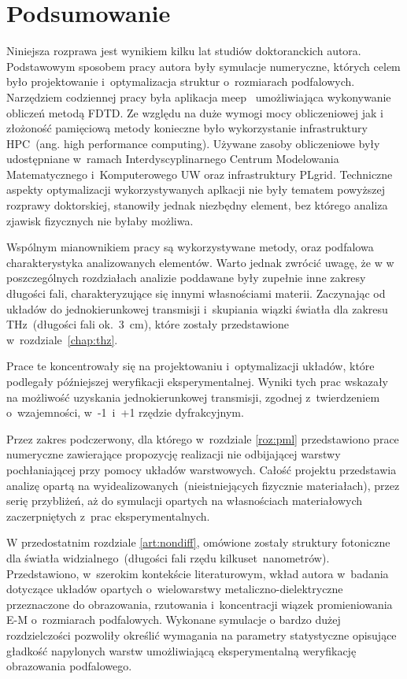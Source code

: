 \chapter{Podsumowanie}
Niniejsza rozprawa jest wynikiem kilku lat studiów doktoranckich autora. Podstawowym sposobem pracy autora były symulacje numeryczne, których celem było projektowanie i~optymalizacja struktur o~rozmiarach podfalowych. Narzędziem codziennej pracy była aplikacja meep~\cite{OskooiRo10} umożliwiająca wykonywanie obliczeń metodą FDTD. Ze względu na duże wymogi mocy obliczeniowej jak i złożoność pamięciową metody konieczne było wykorzystanie infrastruktury HPC~(ang. high performance computing). Używane zasoby obliczeniowe były udostępniane w~ramach Interdyscyplinarnego Centrum Modelowania Matematycznego i~Komputerowego UW oraz infrastruktury PLgrid. Techniczne aspekty optymalizacji wykorzystywanych aplkacji nie były tematem powyższej rozprawy doktorskiej, stanowiły jednak niezbędny element, bez którego analiza zjawisk fizycznych nie byłaby możliwa.

Wspólnym mianownikiem pracy są wykorzystywane metody, oraz podfalowa charakterystyka analizowanych elementów. Warto jednak zwrócić uwagę, że w w poszczególnych rozdziałach analizie poddawane były zupełnie inne zakresy długości fali, charakteryzujące się innymi własnościami materii. Zaczynając od układów do jednokierunkowej transmisji i~skupiania wiązki światła dla zakresu THz~(długości fali ok.~3~cm), które zostały przedstawione w~rozdziale~\ref{chap:thz}. 

Prace te koncentrowały się na projektowaniu i~optymalizacji układów, które podlegały późniejszej weryfikacji eksperymentalnej. Wyniki tych prac wskazały na możliwość uzyskania jednokierunkowej transmisji, zgodnej z~twierdzeniem o~wzajemności, w~-1~i~+1 rzędzie dyfrakcyjnym. 

Przez zakres podczerwony, dla którego w~rozdziale \ref{roz:pml} przedstawiono prace numeryczne zawierające propozycję realizacji nie odbijającej warstwy pochłaniającej przy pomocy układów warstwowych. Całość projektu przedstawia analizę opartą na wyidealizowanych~(nieistniejących fizycznie materiałach), przez serię przybliżeń, aż do symulacji opartych na własnościach materiałowych zaczerpniętych z~prac eksperymentalnych.

W przedostatnim  rozdziale \ref{art:nondiff},  omówione zostały struktury fotoniczne dla światła widzialnego~(długości fali rzędu kilkuset~nanometrów). Przedstawiono, w~szerokim kontekście literaturowym, wkład autora w~badania dotyczące układów opartych o~wielowarstwy metaliczno-dielektryczne przeznaczone do obrazowania, rzutowania i~koncentracji wiązek promieniowania E-M o~rozmiarach podfalowych. Wykonane symulacje o bardzo dużej rozdzielczości pozwoliły określić wymagania na parametry statystyczne opisujące gładkość napylonych warstw umożliwiającą eksperymentalną weryfikację obrazowania podfalowego.

